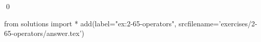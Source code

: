 
\begin{ex}
  \label{ex:2-65-operators}
  
  \qed
\end{ex}
\begin{python0}
from solutions import *
add(label="ex:2-65-operators",
    srcfilename='exercises/2-65-operators/answer.tex')
\end{python0}
